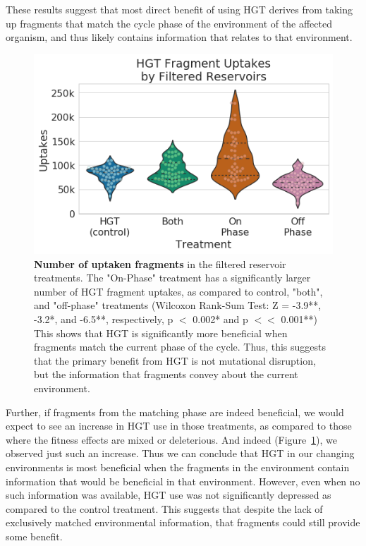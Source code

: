 \documentclass[PhD]{msu-thesis}
\begin{document}
These results suggest that most direct benefit of using HGT derives from taking up fragments that match the cycle phase of the environment of the affected organism, and thus likely contains information that relates to that environment. %
	\begin{figure}[h!]
	\begin{center}
	\includegraphics[width=0.75\columnwidth]{figures/HGT/hgt_use_by_cycle_phase_source.png}
	\caption{\textbf{Number of uptaken fragments} in the filtered reservoir treatments. The "On-Phase" treatment has a significantly larger number of HGT fragment uptakes, as compared to control, "both", and "off-phase" treatments (Wilcoxon Rank-Sum Test: Z = -3.9**, -3.2*, and -6.5**, respectively, p $<$ 0.002* and p $<<$ 0.001**) This shows that HGT is significantly more beneficial when fragments match the current phase of the cycle. Thus, this suggests that the primary benefit from HGT is not mutational disruption, but the information that fragments convey about the current environment.
	}\label{fig:hgt_use_by_cycle_phase_source}
	\end{center}
	\end{figure}
Further, if fragments from the matching phase are indeed beneficial, we would expect to see an increase in HGT use in those treatments, as compared to those where the fitness effects are mixed or deleterious. And indeed (Figure~\ref{fig:hgt_use_by_cycle_phase_source}), we observed just such an increase. Thus we can conclude that HGT in our
changing environments is most beneficial when the fragments in the environment contain information that would be beneficial in that environment. However, even when no such information was available, HGT use was not significantly depressed as compared to the control treatment. This suggests that despite the lack of exclusively matched environmental information, that fragments could still provide some benefit. 
\end{document}
